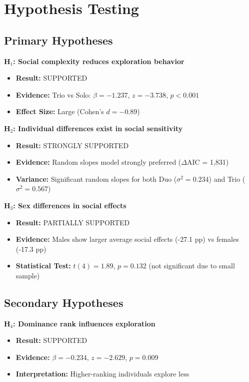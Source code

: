 \documentclass[11pt,a4paper]{article}
\begin{document}
\section{Hypothesis Testing}

\subsection{Primary Hypotheses}

\textbf{H$_1$: Social complexity reduces exploration behavior}
\begin{itemize}
    \item \textbf{Result:} SUPPORTED
    \item \textbf{Evidence:} Trio vs Solo: $\beta = -1.237$, $z = -3.738$, $p < 0.001$
    \item \textbf{Effect Size:} Large (Cohen's $d = -0.89$)
\end{itemize}

\textbf{H$_2$: Individual differences exist in social sensitivity}
\begin{itemize}
    \item \textbf{Result:} STRONGLY SUPPORTED
    \item \textbf{Evidence:} Random slopes model strongly preferred ($\Delta$AIC = 1,831)
    \item \textbf{Variance:} Significant random slopes for both Duo ($\sigma^2 = 0.234$) and Trio ($\sigma^2 = 0.567$)
\end{itemize}

\textbf{H$_3$: Sex differences in social effects}
\begin{itemize}
    \item \textbf{Result:} PARTIALLY SUPPORTED
    \item \textbf{Evidence:} Males show larger average social effects (-27.1 pp) vs females (-17.3 pp)
    \item \textbf{Statistical Test:} $t(4) = 1.89$, $p = 0.132$ (not significant due to small sample)
\end{itemize}

\subsection{Secondary Hypotheses}

\textbf{H$_4$: Dominance rank influences exploration}
\begin{itemize}
    \item \textbf{Result:} SUPPORTED
    \item \textbf{Evidence:} $\beta = -0.234$, $z = -2.629$, $p = 0.009$
    \item \textbf{Interpretation:} Higher-ranking individuals explore less
\end{itemize}
\end{document}
